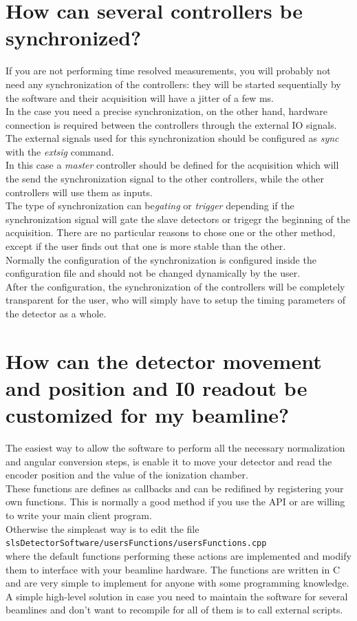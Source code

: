 \section{How can several controllers be synchronized?} \label{sec:sync}
If you are not performing time resolved measurements, you will probably not need any synchronization of the controllers: they will be started sequentially by the software and their acquisition will have a jitter of a few ms. \\
In the case you need a precise synchronization, on the other hand, hardware connection is required between the controllers through the external IO signals. The external signals used for this synchronization should be configured as \textit{sync} with the \textit{extsig} command. \\
In this case a \textit{master} controller should be defined for the acquisition which will the send the synchronization signal to the other controllers, while the other controllers will use them as inputs.\\
The type of synchronization can be\textit{gating} or \textit{trigger} depending if the synchronization signal will gate the slave detectors or trigegr the beginning of the acquisition. There are no particular reasons to chose one or the other method, except if the user finds out that one is more stable than the other.\\
Normally the configuration of the synchronization is configured inside the configuration file and should not be changed dynamically by the user.\\

After the configuration, the synchronization of the controllers will be completely transparent for the user, who will simply have to setup the timing parameters of the detector as a whole.

\section{How can the detector movement and position and I0 readout be customized for my beamline?} \label{sec:usersFunc}

The easiest way to allow the software to perform all the necessary normalization and angular conversion steps, is enable it to move your detector and read the encoder position and the value of the ionization chamber.\\
These functions are defines as callbacks and can be redifined by registering your own functions. This is normally a good method if you use the API or are willing to write your main client program.\\
Otherwise the simpleast way is to edit the file\\ 
\verb=slsDetectorSoftware/usersFunctions/usersFunctions.cpp= \\
where the default functions performing these actions are implemented and modify them to interface with your beamline hardware. The functions are written in C and are very simple to implement for anyone with some programming knowledge.\\
A simple high-level solution in case you need to maintain the software for several beamlines and don't want to recompile for all of them is to call external scripts.


